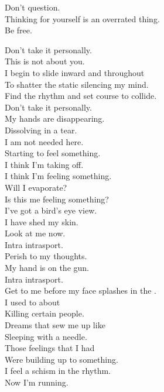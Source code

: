Don't question. \\
Thinking for yourself is an overrated thing. \\
Be free. \\





Don't take it personally. \\
This is not about you. \\
I begin to slide inward and throughout \\
To shatter the static silencing my mind. \\
Find the rhythm and set course to collide. \\

Don't take it personally. \\
My hands are disappearing. \\
Dissolving in a tear. \\
I am not needed here. \\

Starting to feel something. \\
I think I'm taking off. \\
I think I'm feeling something. \\
Will I evaporate? \\
Is this me feeling something? \\
I've got a bird's eye view. \\
I have shed my skin. \\
Look at me now. \\

Intra intrasport. \\
Perish to my thoughts. \\
My hand is on the gun. \\
Intra intrasport. \\
Get to me before my face splashes in the . \\

I used to  about \\
Killing certain people. \\
Dreams that sew me up like \\
Sleeping with a needle. \\
Those feelings that I had \\
Were building up to something. \\
I feel a schism in the rhythm. \\
Now I'm running. \\

